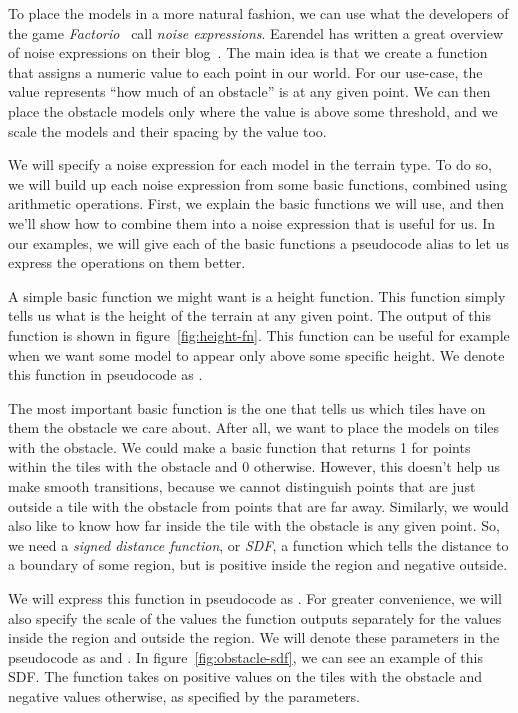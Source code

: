 To place the models in a more natural fashion, we can use what the developers of the game \emph{Factorio}~\cite{Factorio} call \emph{noise expressions}.
Earendel has written a great overview of noise expressions on their blog~\cite{NoiseExpressions}.
The main idea is that we create a function that assigns a numeric value to each point in our world.
For our use-case, the value represents \enquote{how much of an obstacle} is at any given point.
We can then place the obstacle models only where the value is above some threshold, and we scale the models and their spacing by the value too.

We will specify a noise expression for each model in the terrain type.
To do so, we will build up each noise expression from some basic functions, combined using arithmetic operations.
First, we explain the basic functions we will use, and then we'll show how to combine them into a noise expression that is useful for us.
In our examples, we will give each of the basic functions a pseudocode alias to let us express the operations on them better.

A simple basic function we might want is a height function.
This function simply tells us what is the height of the terrain at any given point.
The output of this function is shown in figure~\ref{fig:height-fn}.
This function can be useful for example when we want some model to appear only above some specific height.
We denote this function in pseudocode as .

The most important basic function is the one that tells us which tiles have on them the obstacle we care about.
After all, we want to place the models on tiles with the obstacle.
We could make a basic function that returns 1 for points within the tiles with the obstacle and 0 otherwise.
However, this doesn't help us make smooth transitions, because we cannot distinguish points that are just outside a tile with the obstacle from points that are far away.
Similarly, we would also like to know how far inside the tile with the obstacle is any given point.
So, we need a \emph{signed distance function}, or \emph{SDF}, a function which tells the distance to a boundary of some region, but is positive inside the region and negative outside.

We will express this function in pseudocode as .
For greater convenience, we will also specify the scale of the values the function outputs separately for the values inside the region and outside the region.
We will denote these parameters in the pseudocode as  and .
In figure~\ref{fig:obstacle-sdf}, we can see an example of this SDF.
The function takes on positive values on the tiles with the obstacle and negative values otherwise, as specified by the parameters.

